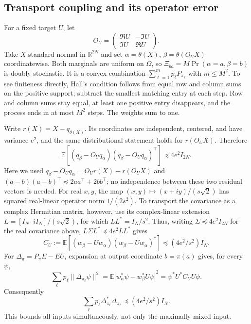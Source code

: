 \documentclass[11pt,a4paper]{article}
\theoremstyle{plain}
\theoremstyle{definition}
\theoremstyle{remark}
\newcommand{\R}{\mathbb R}
\newcommand{\E}{\mathbb E}
\begin{document}
\subsection{Transport coupling and its operator error}
For a fixed target $U$, let
\[
 O_U=\begin{pmatrix}\Re U&-\Im U\\ \Im U&\Re U\end{pmatrix}.
\]
Take $X$ standard normal in $\R^{2N}$ and set
$\alpha=\theta(X)$, $\beta=\theta(O_UX)$ coordinatewise.
Both marginals are uniform on $\Omega$, so
$\Xi_{ba}=M\Pr(\alpha=a,\beta=b)$ is doubly stochastic.
It is a convex combination $\sum_{\ell=1}^{m}p_\ell P_{\pi_\ell}$
with $m\le M^2$. To see finiteness directly, Hall's condition follows
from equal row and column sums on the positive support; subtract the
smallest matching entry at each step. Row and column sums stay equal,
at least one positive entry disappears, and the process ends in at most
$M^2$ steps. The weights sum to one.

Write $r(X)=X-q_{\theta(X)}$. Its coordinates are independent,
centered, and have variance $e^2$, and the same distributional statement
holds for $r(O_UX)$. Therefore
\[
 \E[(q_\beta-O_Uq_\alpha)(q_\beta-O_Uq_\alpha)^\top]
 \preceq4e^2 I_{2N}.
\]
Here we used $q_\beta-O_Uq_\alpha=O_Ur(X)-r(O_UX)$ and
$(a-b)(a-b)^\top\preceq2aa^\top+2bb^\top$; no independence
between these two residual vectors is needed. For real $x,y$, the map
$(x,y)\mapsto(x+iy)/(s\sqrt2)$ has squared real-linear operator norm $1/(2s^2)$.
To transport the covariance as a complex Hermitian matrix, however, use its
complex-linear extension $L=[I_N\;\;iI_N]/(s\sqrt2)$, for which
$LL^*=I_N/s^2$. Thus, writing $\Sigma\preceq4e^2I_{2N}$ for the real
covariance above, $L\Sigma L^*\preceq4e^2LL^*$ gives
\[
 C_U:=\E[(w_\beta-Uw_\alpha)(w_\beta-Uw_\alpha)^*]
 \preceq(4e^2/s^2)I_N.
\]
For $\Delta_\pi=P_\pi E-EU$, expansion at output coordinate
$b=\pi(a)$ gives, for every $\psi$,
\[
 \sum_\ell p_\ell\|\Delta_{\pi_\ell}\psi\|^2
 =\E|w_\alpha^*\psi-w_\beta^*U\psi|^2
 =\psi^*U^*C_UU\psi.
\]
Consequently
\begin{equation}\label{eq:transport-covariance}
 \sum_\ell p_\ell\Delta_{\pi_\ell}^*\Delta_{\pi_\ell}
 \preceq (4e^2/s^2)I_N .
\end{equation}
This bounds all inputs simultaneously, not only the maximally mixed input.
\end{document}
